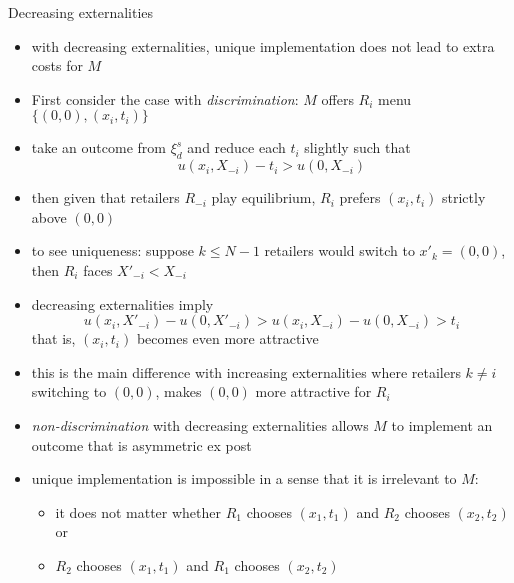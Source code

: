 \documentclass[11pt,english]{beamer}
\begin{document}
\begin{frame}[allowframebreaks]{Decreasing externalities}
  \begin{itemize}
  \item with decreasing externalities, unique implementation does not
    lead to extra costs for $M$
  \item First consider the case with \emph{discrimination}: $M$ offers
    $R_i$ menu $\{(0,0),(x_i,t_i)\}$
  \item take an outcome from $\xi_d^s$ and reduce each $t_i$ slightly
    such that
    \begin{equation*}
      u(x_i,X_{-i})-t_i > u(0,X_{-i})
    \end{equation*}
  \item then given that retailers $R_{-i}$ play equilibrium, $R_i$ prefers
    $(x_i,t_i)$ strictly above $(0,0)$
  \item to see uniqueness: suppose $k \leq N-1$ retailers would switch
    to $x'_k = (0,0)$, then $R_i$ faces $X'_{-i} <X_{-i}$
  \item decreasing externalities imply
    \begin{equation*}
      u(x_i,X'_{-i})-u(0,X'_{-i}) > u(x_i,X_{-i})-u(0,X_{-i}) > t_i
    \end{equation*}
    that is, $(x_i,t_i)$ becomes even more attractive
  \item this is the main difference with increasing externalities
    where retailers $k \neq i$ switching to $(0,0)$, makes $(0,0)$
    more attractive for $R_i$
  \item \emph{non-discrimination} with decreasing externalities allows
    $M$ to implement an outcome that is asymmetric ex post
  \item unique implementation is impossible in a sense that it is
    irrelevant to $M$:
    \begin{itemize}
    \item it does not matter whether $R_1$ chooses $(x_1,t_1)$ and
      $R_2$ chooses $(x_2,t_2)$ or
    \item $R_2$ chooses $(x_1,t_1)$ and $R_1$ chooses $(x_2,t_2)$    \end{itemize}
  \end{itemize}
\end{frame}
\end{document}
